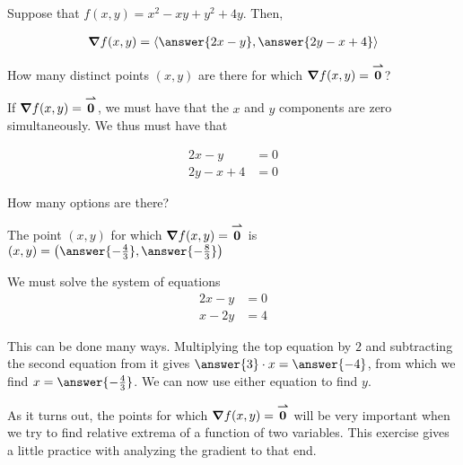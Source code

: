 \documentclass{ximera}
\author{Jim Talamo}
\begin{document}
\begin{exercise}
Suppose that $f(x,y) =x^2-xy+y^2+4y$.  Then,

\begin{align*}
\grad{f}(x,y) &= \vector{\answer{2x-y},\answer{2y-x+4}} \\
\end{align*}

\begin{exercise}
How many distinct points $(x,y)$ are there for which $\boldsymbol\nabla{f}(x,y) = {\overset{\boldsymbol{\rightharpoonup}}{\mathbf{0}}}$?

\begin{multipleChoice}
\end{multipleChoice}

\begin{hint}
If $\boldsymbol\nabla{f}(x,y) = {\overset{\boldsymbol{\rightharpoonup}}{\mathbf{0}}}$, we must have that the $x$ and $y$ components are zero simultaneously.  We thus must have that 

\begin{align*}
2x-y&=0 \\
2y-x+4 &=0 
\end{align*}

How many options are there?
\end{hint}

\begin{exercise}
The point $(x,y)$ for which $\boldsymbol\nabla{f}(x,y) = {\overset{\boldsymbol{\rightharpoonup}}{\mathbf{0}}}$ is $(x,y) = \left(\answer{-\frac{4}{3}},\answer{-\frac{8}{3}} \right)$

\begin{hint}
We must solve the system of equations
\begin{align}
2x-y&=0 \\
x-2y &=4 
\end{align}
\end{hint}

This can be done many ways.  Multiplying the top equation by $2$ and subtracting the second equation from it gives $\answer{3} \cdot x = \answer{-4}$, from which we find $x = \answer{-\frac{4}{3}}$.  We can now use either equation to find $y$.

\begin{remark}
As it turns out, the points for which $\boldsymbol\nabla{f}(x,y) = {\overset{\boldsymbol{\rightharpoonup}}{\mathbf{0}}}$ will be very important when we try to find relative extrema of a function of two variables.  This exercise gives a little practice with analyzing the gradient to that end.
\end{remark}
\end{exercise}
\end{exercise}
\end{exercise}
\end{document}
